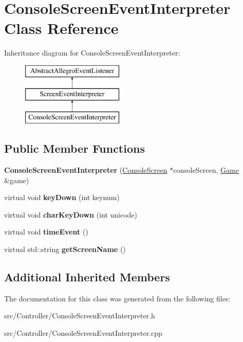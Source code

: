 \hypertarget{classConsoleScreenEventInterpreter}{}\section{Console\+Screen\+Event\+Interpreter Class Reference}
\label{classConsoleScreenEventInterpreter}
Inheritance diagram for Console\+Screen\+Event\+Interpreter\+:\begin{figure}[H]
\begin{center}
\leavevmode
\includegraphics[height=3.000000cm]{classConsoleScreenEventInterpreter}
\end{center}
\end{figure}
\subsection*{Public Member Functions}
\begin{DoxyCompactItemize}
\item 
{\bfseries Console\+Screen\+Event\+Interpreter} (\hyperlink{classConsoleScreen}{Console\+Screen} $\ast$console\+Screen, \hyperlink{classGame}{Game} \&game)\hypertarget{classConsoleScreenEventInterpreter_a16532522d008b711ed848320a757fdfa}{}\label{classConsoleScreenEventInterpreter_a16532522d008b711ed848320a757fdfa}

\item 
virtual void {\bfseries key\+Down} (int keynum)\hypertarget{classConsoleScreenEventInterpreter_aec30e5200c0ed4f8983a457f85e5643b}{}\label{classConsoleScreenEventInterpreter_aec30e5200c0ed4f8983a457f85e5643b}

\item 
virtual void {\bfseries char\+Key\+Down} (int unicode)\hypertarget{classConsoleScreenEventInterpreter_ab55a2e02c5a3ed8e7b7ad4ececc04f9e}{}\label{classConsoleScreenEventInterpreter_ab55a2e02c5a3ed8e7b7ad4ececc04f9e}

\item 
virtual void {\bfseries time\+Event} ()\hypertarget{classConsoleScreenEventInterpreter_a74c757a9c88027df958af48945345248}{}\label{classConsoleScreenEventInterpreter_a74c757a9c88027df958af48945345248}

\item 
virtual std\+::string {\bfseries get\+Screen\+Name} ()\hypertarget{classConsoleScreenEventInterpreter_acba5aab5a9c627e47f636cb6d58645c5}{}\label{classConsoleScreenEventInterpreter_acba5aab5a9c627e47f636cb6d58645c5}

\end{DoxyCompactItemize}
\subsection*{Additional Inherited Members}


The documentation for this class was generated from the following files\+:\begin{DoxyCompactItemize}
\item 
src/\+Controller/Console\+Screen\+Event\+Interpreter.\+h\item 
src/\+Controller/Console\+Screen\+Event\+Interpreter.\+cpp\end{DoxyCompactItemize}
